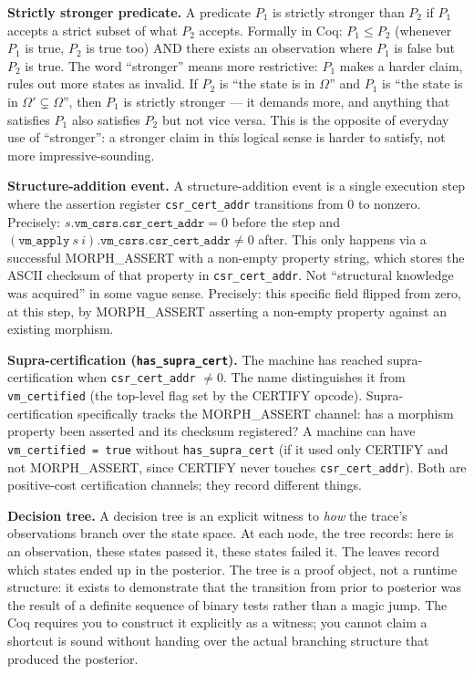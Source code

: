 \documentclass[11pt,a4paper]{article}
\theoremstyle{plain}
\theoremstyle{definition}
\theoremstyle{remark}
\begin{document}
\medskip
\noindent\textbf{Strictly stronger predicate.}
A predicate $P_1$ is strictly stronger than $P_2$ if $P_1$ accepts a strict subset of what $P_2$ accepts. Formally in Coq: $P_1 \leq P_2$ (whenever $P_1$ is true, $P_2$ is true too) AND there exists an observation where $P_1$ is false but $P_2$ is true. The word ``stronger'' means more restrictive: $P_1$ makes a harder claim, rules out more states as invalid. If $P_2$ is ``the state is in $\Omega$'' and $P_1$ is ``the state is in $\Omega' \subsetneq \Omega$'', then $P_1$ is strictly stronger --- it demands more, and anything that satisfies $P_1$ also satisfies $P_2$ but not vice versa. This is the opposite of everyday use of ``stronger'': a stronger claim in this logical sense is harder to satisfy, not more impressive-sounding.

\medskip
\noindent\textbf{Structure-addition event.}
A structure-addition event is a single execution step where the assertion register \texttt{csr\_cert\_addr} transitions from 0 to nonzero. Precisely: $s.\texttt{vm\_csrs}.\texttt{csr\_cert\_addr} = 0$ before the step and $(\texttt{vm\_apply}\ s\ i).\texttt{vm\_csrs}.\texttt{csr\_cert\_addr} \neq 0$ after. This only happens via a successful MORPH\_ASSERT with a non-empty property string, which stores the ASCII checksum of that property in \texttt{csr\_cert\_addr}. Not ``structural knowledge was acquired'' in some vague sense. Precisely: this specific field flipped from zero, at this step, by MORPH\_ASSERT asserting a non-empty property against an existing morphism.

\medskip
\noindent\textbf{Supra-certification (\texttt{has\_supra\_cert}).}
The machine has reached supra-certification when \texttt{csr\_cert\_addr} $\neq 0$. The name distinguishes it from \texttt{vm\_certified} (the top-level flag set by the CERTIFY opcode). Supra-certification specifically tracks the MORPH\_ASSERT channel: has a morphism property been asserted and its checksum registered? A machine can have \texttt{vm\_certified = true} without \texttt{has\_supra\_cert} (if it used only CERTIFY and not MORPH\_ASSERT, since CERTIFY never touches \texttt{csr\_cert\_addr}). Both are positive-cost certification channels; they record different things.

\medskip
\noindent\textbf{Decision tree.}
A decision tree is an explicit witness to \emph{how} the trace's observations branch over the state space. At each node, the tree records: here is an observation, these states passed it, these states failed it. The leaves record which states ended up in the posterior. The tree is a proof object, not a runtime structure: it exists to demonstrate that the transition from prior to posterior was the result of a definite sequence of binary tests rather than a magic jump. The Coq requires you to construct it explicitly as a witness; you cannot claim a shortcut is sound without handing over the actual branching structure that produced the posterior.
\end{document}
